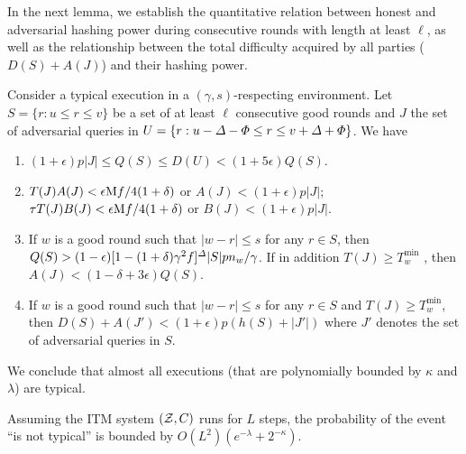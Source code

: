 In the next lemma, we establish the quantitative relation between honest and adversarial hashing power during consecutive rounds with length at least $\ell$, as well as the relationship between the total difficulty acquired by all parties ($D(S) + A(J)$) and their hashing power.

\begin{lemma} \label{lemma:typical-execution-result}
    Consider a typical execution in a $(\gamma, s)$-respecting environment.
    Let $S = \{r : u \le r \le v \}$ be a set of at least $\ell$ consecutive good rounds and $J$ the set of adversarial queries in $U = \{ r : u - \varDelta - \varPhi \le r \le v + \varDelta + \varPhi \}$.
    We have
    \begin{enumerate}[label=(\alph*), leftmargin=*, noitemsep]
        \item $(1 + \epsilon) p|J| \le Q(S) \le D(U) < (1 + 5\epsilon) Q(S)$.

        \item $T(J) A(J) < \epsilon \mathrm{M} f / 4(1 + \delta)$ or $A(J) < (1 + \epsilon)p|J|$; $\tau T(J) B(J) < \epsilon \mathrm{M} f / 4(1 + \delta)$ or $B(J) < (1 + \epsilon) p|J|$.

        \item If $w$ is a good round such that $|w - r| \le s$ for any $r \in S$, then $Q(S) > (1 - \epsilon) [1 - (1 + \delta) \gamma^2 f]^\varDelta |S| p n_w / \gamma$.
              If in addition $T(J) \ge T^{\min}_w$ , then $A(J) < (1 - \delta + 3\epsilon) Q(S)$.

        \item If $w$ is a good round such that $|w - r| \le s$ for any $r \in S$ and $T(J) \ge T^{\min}_w$, then $D(S) + A(J') < (1 + \epsilon) p(h(S) + |J'|)$ where $J'$ denotes the set of adversarial queries in $S$.
    \end{enumerate}
\end{lemma}

We conclude that almost all executions (that are polynomially bounded by $\kappa$ and $\lambda$) are typical.

\begin{theorem} \label{thm:typical-execution-error-prob}
    Assuming the ITM system $(\mathcal{Z}, C)$ runs for $L$ steps, the probability of the event ``\E is not typical'' is bounded by $O(L^2)(e^{-\lambda} + 2^{-\kappa})$.
\end{theorem}
